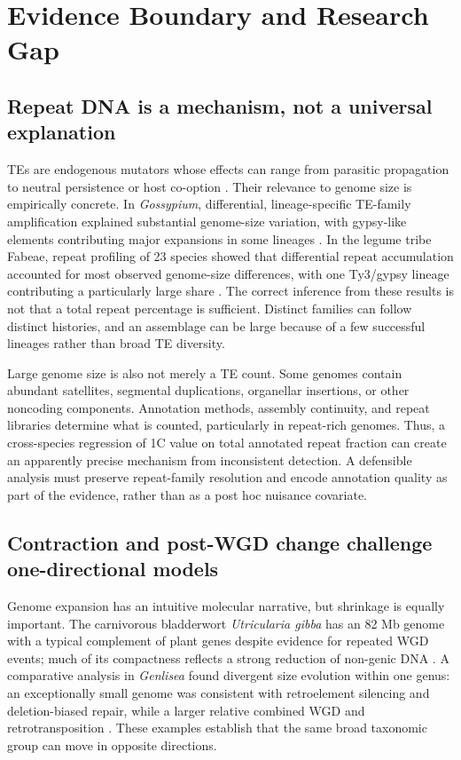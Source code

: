 \documentclass[conference]{IEEEtran}
\begin{document}
\section{Evidence Boundary and Research Gap}

\subsection{Repeat DNA is a mechanism, not a universal explanation}

TEs are endogenous mutators whose effects can range from parasitic propagation to neutral persistence or host co-option \cite{kidwell2001}. Their relevance to genome size is empirically concrete. In \emph{Gossypium}, differential, lineage-specific TE-family amplification explained substantial genome-size variation, with gypsy-like elements contributing major expansions in some lineages \cite{hawkins2006}. In the legume tribe Fabeae, repeat profiling of 23 species showed that differential repeat accumulation accounted for most observed genome-size differences, with one Ty3/gypsy lineage contributing a particularly large share \cite{macas2015}. The correct inference from these results is not that a total repeat percentage is sufficient. Distinct families can follow distinct histories, and an assemblage can be large because of a few successful lineages rather than broad TE diversity.

Large genome size is also not merely a TE count. Some genomes contain abundant satellites, segmental duplications, organellar insertions, or other noncoding components. Annotation methods, assembly continuity, and repeat libraries determine what is counted, particularly in repeat-rich genomes. Thus, a cross-species regression of 1C value on total annotated repeat fraction can create an apparently precise mechanism from inconsistent detection. A defensible analysis must preserve repeat-family resolution and encode annotation quality as part of the evidence, rather than as a post hoc nuisance covariate.

\subsection{Contraction and post-WGD change challenge one-directional models}

Genome expansion has an intuitive molecular narrative, but shrinkage is equally important. The carnivorous bladderwort \emph{Utricularia gibba} has an 82 Mb genome with a typical complement of plant genes despite evidence for repeated WGD events; much of its compactness reflects a strong reduction of non-genic DNA \cite{ibarra2013}. A comparative analysis in \emph{Genlisea} found divergent size evolution within one genus: an exceptionally small genome was consistent with retroelement silencing and deletion-biased repair, while a larger relative combined WGD and retrotransposition \cite{vu2015}. These examples establish that the same broad taxonomic group can move in opposite directions.
\end{document}
